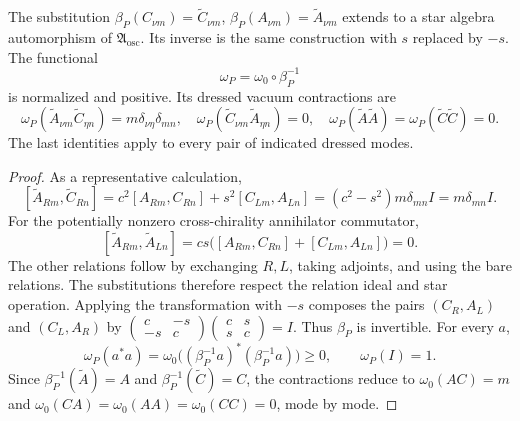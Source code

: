 \begin{proposition}
\label{prop:ch20b-dressing}
The substitution \(\beta_P(C_{\nu m})=\widetilde C_{\nu m}\),
\(\beta_P(A_{\nu m})=\widetilde A_{\nu m}\) extends to a star
algebra automorphism of \(\mathfrak A_{\mathrm{osc}}\).  Its inverse is
the same construction with \(s\) replaced by \(-s\).  The functional
\begin{equation}
 \omega_P=\omega_0\circ\beta_P^{-1}
 \label{eq:ch20b-omegaP}
\end{equation}
is normalized and positive.  Its dressed vacuum contractions are
\begin{equation}
 \omega_P(\widetilde A_{\nu m}\widetilde C_{\eta n})
 =m\delta_{\nu\eta}\delta_{mn},\quad
 \omega_P(\widetilde C_{\nu m}\widetilde A_{\eta n})=0,
 \quad\omega_P(\widetilde A\widetilde A)
 =\omega_P(\widetilde C\widetilde C)=0.
 \label{eq:ch20b-dressed-contractions}
\end{equation}
The last identities apply to every pair of indicated dressed modes.
\end{proposition}
\begin{proof}
As a representative calculation,
\[
 [\widetilde A_{Rm},\widetilde C_{Rn}]
 =c^2[A_{Rm},C_{Rn}]+s^2[C_{Lm},A_{Ln}]
 =(c^2-s^2)m\delta_{mn}I=m\delta_{mn}I.
\]
For the potentially nonzero cross-chirality annihilator commutator,
\[
 [\widetilde A_{Rm},\widetilde A_{Ln}]
 =cs\bigl([A_{Rm},C_{Rn}]+[C_{Lm},A_{Ln}]\bigr)=0.
\]
The other relations follow by exchanging \(R,L\), taking adjoints,
and using the bare relations.  The substitutions therefore respect the
relation ideal and star operation.  Applying the transformation with
\(-s\) composes the pairs
\((C_R,A_L)\) and \((C_L,A_R)\) by
\(\left(\begin{smallmatrix}c&-s\\-s&c\end{smallmatrix}\right)
  \left(\begin{smallmatrix}c&s\\s&c\end{smallmatrix}\right)=I\).
Thus \(\beta_P\) is invertible.  For every \(a\),
\[
 \omega_P(a^*a)
 =\omega_0\bigl((\beta_P^{-1}a)^*(\beta_P^{-1}a)\bigr)\geq0,
 \qquad\omega_P(I)=1.
\]
Since \(\beta_P^{-1}(\widetilde A)=A\) and
\(\beta_P^{-1}(\widetilde C)=C\), the contractions reduce to
\(\omega_0(AC)=m\) and
\(\omega_0(CA)=\omega_0(AA)=\omega_0(CC)=0\), mode by mode.
\end{proof}

